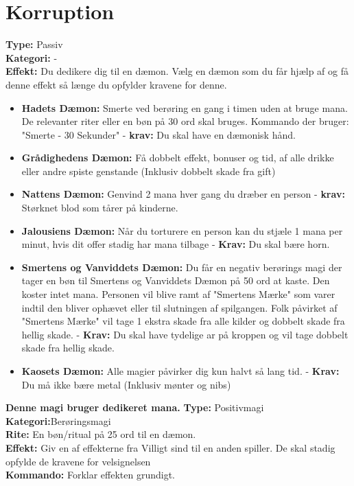 \section{Korruption}
\begin{korruption*}
\textbf{Type:} Passiv\\
\textbf{Kategori:} -\\
    \textbf{Effekt:} Du dedikere dig til en dæmon. Vælg en dæmon som du får hjælp af og få denne effekt så længe du opfylder kravene for denne.
        \begin{itemize}
            \item \textbf{Hadets Dæmon:} Smerte ved berøring en gang i timen uden at bruge mana. De relevanter riter eller en bøn på 30 ord skal bruges. Kommando der bruger: "Smerte - 30 Sekunder" - \textbf{krav:} Du skal have en dæmonisk hånd.
            \item \textbf{Grådighedens Dæmon:} Få dobbelt effekt, bonuser og tid, af alle drikke eller andre spiste genstande (Inklusiv dobbelt skade fra gift)
            \item \textbf{Nattens Dæmon:} Genvind 2 mana hver gang du dræber en person - \textbf{krav:} Størknet blod som tårer på kinderne.
            \item \textbf{Jalousiens Dæmon:} Når du torturere en person kan du stjæle 1 mana per minut, hvis dit offer stadig har mana tilbage - \textbf{Krav:} Du skal bære horn.
            \item \textbf{Smertens og Vanviddets Dæmon:} Du får en negativ berørings magi der tager en bøn til Smertens og Vanviddets Dæmon på 50 ord at kaste. Den koster intet mana. Personen vil blive ramt af "Smertens Mærke" som varer indtil den bliver ophævet eller til slutningen af spilgangen. Folk påvirket af "Smertens Mærke" vil tage 1 ekstra skade fra alle kilder og dobbelt skade fra hellig skade. - \textbf{Krav:} Du skal have tydelige ar på kroppen og vil tage dobbelt skade fra hellig skade.
            \item \textbf{Kaosets Dæmon:} Alle magier påvirker dig kun halvt så lang tid. - \textbf{Krav:} Du må ikke bære metal (Inklusiv mønter og nibs)
        \end{itemize}
    \end{korruption*}

\begin{korruption*}
\textbf{Denne magi bruger dedikeret mana.}
\textbf{Type:} Positivmagi\\
\textbf{Kategori:}Berøringsmagi\\
\textbf{Rite:} En bøn/ritual på 25 ord til en dæmon.\\
\textbf{Effekt:} Giv en af effekterne fra Villigt sind til en anden spiller. De skal stadig opfylde de kravene for velsignelsen\\
\textbf{Kommando:} Forklar effekten grundigt.
\end{korruption*}

